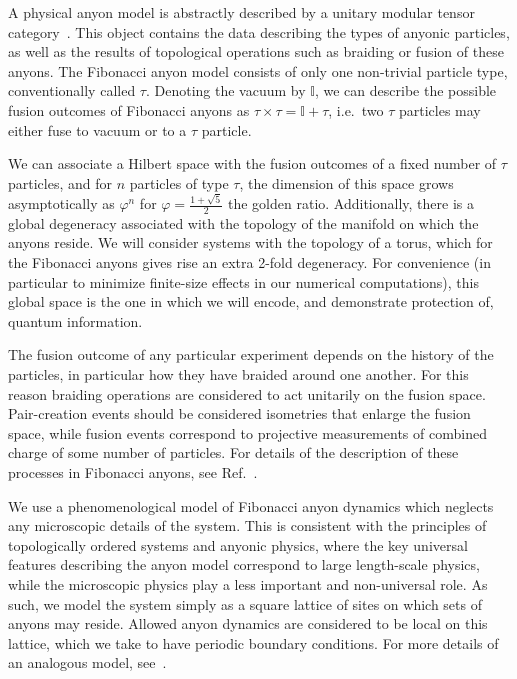 \documentclass[aps, prl, letterpaper, twocolumn, superscriptaddress, notitlepage]{revtex4-1}
\begin{document}
	A physical anyon model is abstractly described by a unitary modular tensor category~\cite{?}. This object contains the data describing the types of anyonic particles, as well as the results of topological operations such as braiding or fusion of these anyons. The Fibonacci anyon model consists of only one non-trivial particle type, conventionally called $\tau$. Denoting the vacuum by $\mathbb{I}$, we can describe the possible fusion outcomes of Fibonacci anyons as $\tau\times\tau=\mathbb{I}+\tau$, i.e.~two $\tau$ particles may either fuse to vacuum or to a $\tau$ particle.

	We can associate a Hilbert space with the fusion outcomes of a fixed number of $\tau$ particles, and for $n$ particles of type $\tau$, the dimension of this space grows asymptotically as $\varphi^n$ for $\varphi=\frac{1+\sqrt{5}}{2}$ the golden ratio. Additionally, there is a global degeneracy associated with the topology of the manifold on which the anyons reside. We will consider systems with the topology of a torus, which for the Fibonacci anyons gives rise an extra 2-fold degeneracy. For convenience (in particular to minimize finite-size effects in our numerical computations), this global space is the one in which we will encode, and demonstrate protection of, quantum information.
	
	The fusion outcome of any particular experiment depends on the history of the particles, in particular how they have braided around one another. For this reason braiding operations are considered to act unitarily on the fusion space. Pair-creation events should be considered isometries that enlarge the fusion space, while fusion events correspond to projective measurements of combined charge of some number of particles. For details of the description of these processes in Fibonacci anyons, see Ref.~\cite{?}.

	We use a phenomenological model of Fibonacci anyon dynamics which neglects any microscopic details of the system. This is consistent with the principles of topologically ordered systems and anyonic physics, where the key universal features describing the anyon model correspond to large length-scale physics, while the microscopic physics play a less important and non-universal role. As such, we model the system simply as a square lattice of sites on which sets of anyons may reside. Allowed anyon dynamics are considered to be local on this lattice, which we take to have periodic boundary conditions. For more details of an analogous model, see~\cite{Brell2013}.
\end{document}
